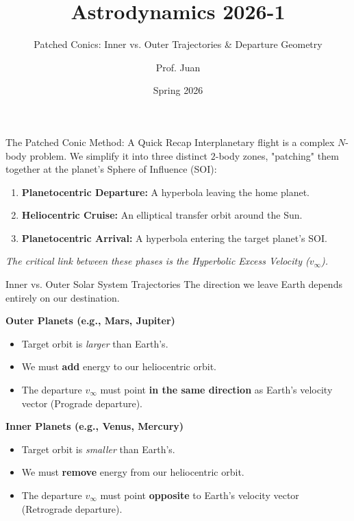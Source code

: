 \documentclass[11pt]{beamer}
\title[Interplanetary Trajectories]{Astrodynamics 2026-1}
\subtitle{Patched Conics: Inner vs. Outer Trajectories \& Departure Geometry}
\author{Prof. Juan}
\institute{Aerospace Engineering Program}
\date{Spring 2026}
\begin{document}
\begin{frame}
    \titlepage
\end{frame}

\begin{frame}{The Patched Conic Method: A Quick Recap}
    Interplanetary flight is a complex $N$-body problem. We simplify it into three distinct $2$-body zones, "patching" them together at the planet's Sphere of Influence (SOI):
    
    \vspace{0.3cm}
    \begin{enumerate}
        \item \textbf{Planetocentric Departure:} A hyperbola leaving the home planet.
        \item \textbf{Heliocentric Cruise:} An elliptical transfer orbit around the Sun.
        \item \textbf{Planetocentric Arrival:} A hyperbola entering the target planet's SOI.
    \end{enumerate}
    
    \vspace{0.3cm}
    \textit{The critical link between these phases is the Hyperbolic Excess Velocity ($v_\infty$).}
\end{frame}

\begin{frame}{Inner vs. Outer Solar System Trajectories}
    The direction we leave Earth depends entirely on our destination.
    
    \vspace{0.3cm}
    \textbf{Outer Planets (e.g., Mars, Jupiter)}
    \begin{itemize}
        \item Target orbit is \textit{larger} than Earth's.
        \item We must \textbf{add} energy to our heliocentric orbit.
        \item The departure $v_\infty$ must point \textbf{in the same direction} as Earth's velocity vector (Prograde departure).
    \end{itemize}

    \vspace{0.3cm}
    \textbf{Inner Planets (e.g., Venus, Mercury)}
    \begin{itemize}
        \item Target orbit is \textit{smaller} than Earth's.
        \item We must \textbf{remove} energy from our heliocentric orbit.
        \item The departure $v_\infty$ must point \textbf{opposite} to Earth's velocity vector (Retrograde departure).
    \end{itemize}
\end{frame}
\end{document}
